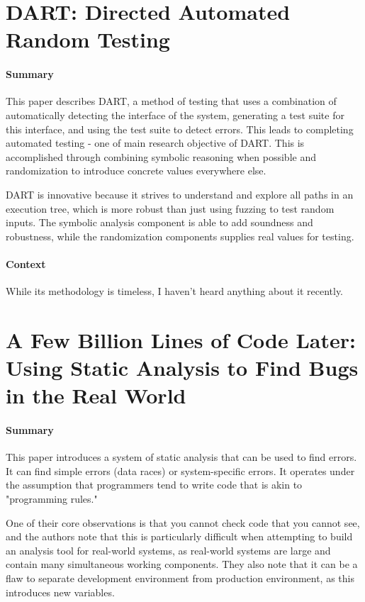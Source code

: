 \section {DART: Directed Automated Random Testing \cite{godefroid2005dart}}

\paragraph{\textbf{Summary}}
This paper describes DART, a method of testing that uses a combination of
automatically detecting the interface of the system, generating a test suite for
this interface, and using the test suite to detect errors. This leads to
completing automated testing - one of main research objective of DART. This is
accomplished through combining symbolic reasoning when possible and
randomization to introduce concrete values everywhere else.

DART is innovative because it strives to understand and explore all paths in an
execution tree, which is more robust than just using fuzzing to test random
inputs. The symbolic analysis component is able to add soundness and robustness,
while the randomization components supplies real values for testing.

\paragraph{\textbf{Context}}
While its methodology is timeless, I haven't heard anything about it recently.

\section {A Few Billion Lines of Code Later: Using Static Analysis to Find Bugs in the Real World \cite{bessey2010few}}

\paragraph{\textbf{Summary}}
This paper introduces a system of static analysis that can be used to find
errors. It can find simple errors (data races) or system-specific errors. It
operates under the assumption that programmers tend to write code that is akin
to "programming rules."

One of their core observations is that you cannot check code that you cannot
see, and the authors note that this is particularly difficult when attempting to
build an analysis tool for real-world systems, as real-world systems are large
and contain many simultaneous working components. They also note that it can be
a flaw to separate development environment from production environment, as this
introduces new variables.

